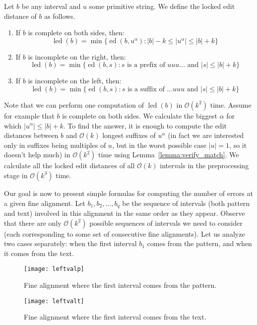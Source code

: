 \documentclass[runningheads]{llncs}
\DeclareMathOperator{\led}{led}
\DeclareMathOperator{\ed}{ed}
\begin{document}
\begin{definition}
Let $b$ be any interval and $u$ some primitive string. We define the locked edit distance of $b$ as follows.
\begin{enumerate}
\item{If $b$ is complete on both sides, then: $$\led(b)=\min \{\ed(b,u^{\alpha}):|b|-k\leq |u^{\alpha}|\leq |b|+k\}$$}
\item{If $b$ is incomplete on the right, then: $$\led(b)=\min \{\ed(b,s):s\mbox{ is a prefix of }uuu... \mbox{ and }|s|\leq |b|+k\}$$}
\item{If $b$ is incomplete on the left, then: $$\led(b)=\min \{\ed(b,s):s\mbox{ is a suffix of }...uuu \mbox{ and }|s|\leq |b|+k\}$$}
\end{enumerate}
\end{definition}
Note that we can perform one computation of $\led(b)$ in $\mathcal{O}(k^2)$ time. Assume for example that $b$ is complete on both sides. We calculate the biggest ${\alpha}$ for which $|u^{\alpha}|\leq |b|+k$. To find the answer, it is enough to compute the edit distances between $b$ and $\mathcal{O}(k)$ longest suffixes of $u^{\alpha}$ (in fact we are interested only in suffixes being multiples of $u$, but in the worst possible case $|u|=1$, so it doesn't help much) in $\mathcal{O}(k^2)$ time using Lemma~\ref{lemma:verify_match}. We calculate all the locked edit distances of all $\mathcal{O}(k)$ intervals in the preprocessing stage in $\mathcal{O}(k^3)$ time.

Our goal is now to present simple formulas for computing the number of errors at a given fine alignment. Let $b_1, b_2, ..., b_q$ be the sequence of intervals (both pattern and text) involved in this alignment in the same order as they appear. Observe that there are only $\mathcal{O}(k^2)$ possible sequences of intervals we need to consider (each corresponding to some set of consecutive fine alignments). Let us analyze two cases separately: when the first interval $b_1$ comes from the pattern, and when it comes from the text.

\begin{figure}[t]
\texttt{[image: leftvalp]}
\caption{Fine alignment where the first interval comes from the pattern.}
\label{figure:leftvalp}
\end{figure}

\begin{figure}[t]
\texttt{[image: leftvalt]}
\caption{Fine alignment where the first interval comes from the text.}
\label{figure:leftvalt}

\end{figure}
\end{document}
